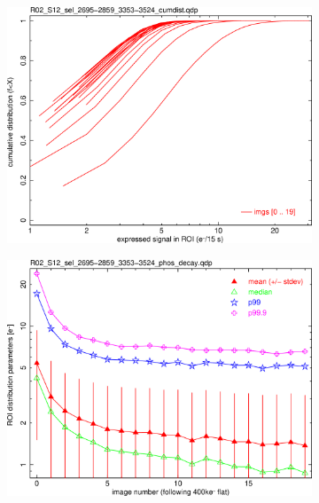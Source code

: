 \begin{figure}[!htbp]
\begin{subfigure}{0.45\textwidth}
  \centering
  \includegraphics[width=\textwidth]{figures/phosphorescence-survey/phos_kinetics/R02_S12_sel_2695-2859_3353-3524_cumdist.png}    
\end{subfigure}
\hfil
\begin{subfigure}{0.45\textwidth}
  \centering
  \includegraphics[width=\textwidth]{figures/phosphorescence-survey/phos_kinetics/R02_S12_sel_2695-2859_3353-3524_phos_decay.png}
\end{subfigure}
\newline
\begin{subfigure}{0.45\textwidth}    
  \centering

\end{subfigure}
\end{figure}
